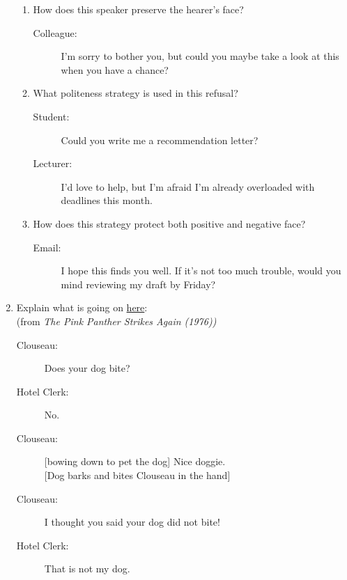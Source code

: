 \documentclass[a4paper]{article}
\begin{document}
\begin{enumerate}
\begin{enumerate}
\item How does this speaker preserve the hearer’s face?
  \begin{description}
    \item[Colleague:] I’m sorry to bother you, but could you maybe take a look at this when you have a chance?
  \end{description}


\item What politeness strategy is used in this refusal?
  \begin{description}
    \item[Student:] Could you write me a recommendation letter?
    \item[Lecturer:] I’d love to help, but I’m afraid I’m already overloaded with deadlines this month.
  \end{description}


\item How does this strategy protect both positive and negative face?
  \begin{description}
    \item[Email:] I hope this finds you well. If it's not too much trouble, would you mind reviewing my draft by Friday?
  \end{description}

\end{enumerate}

\item Explain what is going on \href{https://www.youtube.com/watch?v=lLR-V2S0DC8}{here}:
  \\ (from \textit{The Pink Panther Strikes Again (1976))}
  \begin{description}
    \item[Clouseau:] Does your dog bite?
    \item[Hotel Clerk:] No.
    \item[Clouseau:] [bowing down to pet the dog] Nice doggie.
      \\ {}[Dog barks and bites Clouseau in the hand]
    \item[Clouseau:] I thought you said your dog did not bite!
    \item[Hotel Clerk:] That is not my dog. 
    \end{description}


\end{enumerate}
\end{document}
